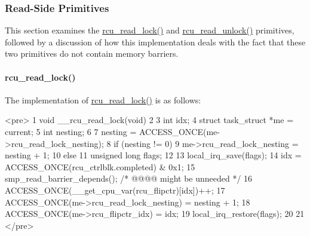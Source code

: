  \QuickQuizEnd


\subsubsection{Read-Side Primitives}
\label{app:rcuimpl:Read-Side Primitives}

This section examines the \url{rcu_read_lock()} and
\url{rcu_read_unlock()} primitives, followed by a
discussion of how this implementation deals with the fact
that these two primitives do not contain memory barriers.

\paragraph{rcu_read_lock()}
\label{app:rcuimpl:rcu_read_lock()}

The implementation of \url{rcu_read_lock()} is as follows:

<pre>  1 void __rcu_read_lock(void)
  2 {
  3   int idx;
  4   struct task_struct *me = current;
  5   int nesting;
  6 
  7   nesting = ACCESS_ONCE(me->rcu_read_lock_nesting);
  8   if (nesting != 0) {
  9     me->rcu_read_lock_nesting = nesting + 1;
 10   } else {
 11     unsigned long flags;
 12 
 13     local_irq_save(flags);
 14     idx = ACCESS_ONCE(rcu_ctrlblk.completed) & 0x1;
 15     smp_read_barrier_depends();  /* @@@@ might be unneeded */
 16     ACCESS_ONCE(__get_cpu_var(rcu_flipctr)[idx])++;
 17     ACCESS_ONCE(me->rcu_read_lock_nesting) = nesting + 1;
 18     ACCESS_ONCE(me->rcu_flipctr_idx) = idx;
 19     local_irq_restore(flags);
 20   }
 21 }
</pre>

